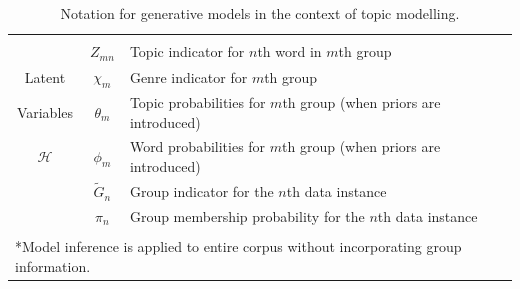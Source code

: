 \begin{table}[h]
\begin{center}
{\begin{tabular}{ ccl%
}
 \hline\\[-3mm]
 &$ Z_{mn} $ & Topic  indicator for $n$th word in $m$th group \\
 Latent   & $ \chi_{m} $ & Genre  indicator for  $m$th group  \\
Variables & $ \theta_{m} $ & Topic probabilities for $m$th group (when priors are introduced)  \\
$\mathcal{H}$  & $ \phi_{m} $ & Word probabilities for $m$th group (when priors are introduced)  \\
& $\tilde{G}_n $ & Group indicator for the $n$th data instance \\
& $\pi_n $ & Group membership probability for the $n$th data instance \\[2mm]
\hline \\[-3mm]
 \multicolumn{3}{l}{*Model inference is applied to  entire corpus without incorporating group information.} \\ 
\end{tabular}
}
\end{center}
 \caption{Notation for generative models  in the context of topic modelling. }
 \label{Notation}
\end{table} 


